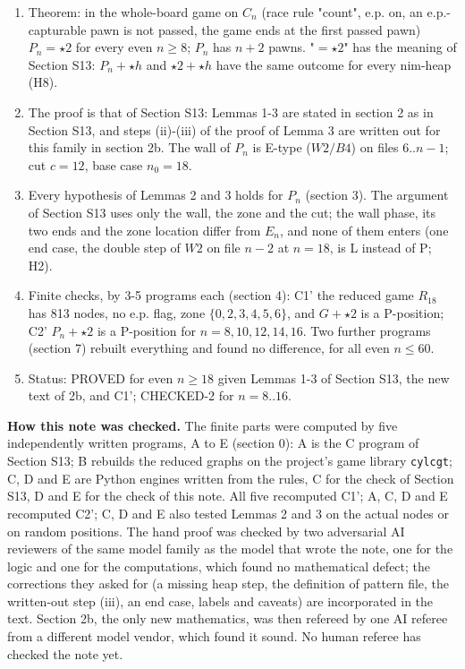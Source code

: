 \begin{enumerate}
\item Theorem: in the whole-board game on $C_n$ (race rule "count", e.p. on, an e.p.-capturable pawn is not passed, the game ends at the first passed pawn) $P_n=\star2$ for every even $n\ge8$; $P_n$ has $n+2$ pawns. "$=\star2$" has the meaning of Section S13: $P_n+\star h$ and $\star2+\star h$ have the same outcome for every nim-heap (H8).
\item The proof is that of Section S13: Lemmas 1-3 are stated in section 2 as in Section S13, and steps (ii)-(iii) of the proof of Lemma 3 are written out for this family in section 2b. The wall of $P_n$ is E-type ($W2/B4$) on files $6..n-1$; cut $c=12$, base case $n_0=18$.
\item Every hypothesis of Lemmas 2 and 3 holds for $P_n$ (section 3). The argument of Section S13 uses only the wall, the zone and the cut; the wall phase, its two ends and the zone location differ from $E_n$, and none of them enters (one end case, the double step of $W2$ on file $n-2$ at $n=18$, is L instead of P; H2).
\item Finite checks, by 3-5 programs each (section 4): C1' the reduced game $R_{18}$ has 813 nodes, no e.p. flag, zone $\{0,2,3,4,5,6\}$, and $G+\star2$ is a P-position; C2' $P_n+\star2$ is a P-position for $n=8,10,12,14,16$. Two further programs (section 7) rebuilt everything and found no difference, for all even $n\le60$.
\item Status: PROVED for even $n\ge18$ given Lemmas 1-3 of Section S13, the new text of 2b, and C1'; CHECKED-2 for $n=8..16$.
\end{enumerate}
\textbf{How this note was checked.} The finite parts were computed by five independently written programs, A to E (section 0): A is the C program of Section S13; B rebuilds the reduced graphs on the project's game library \texttt{cylcgt}; C, D and E are Python engines written from the rules, C for the check of Section S13, D and E for the check of this note. All five recomputed C1'; A, C, D and E recomputed C2'; C, D and E also tested Lemmas 2 and 3 on the actual nodes or on random positions. The hand proof was checked by two adversarial AI reviewers of the same model family as the model that wrote the note, one for the logic and one for the computations, which found no mathematical defect; the corrections they asked for (a missing heap step, the definition of pattern file, the written-out step (iii), an end case, labels and caveats) are incorporated in the text. Section 2b, the only new mathematics, was then refereed by one AI referee from a different model vendor, which found it sound. No human referee has checked the note yet.

